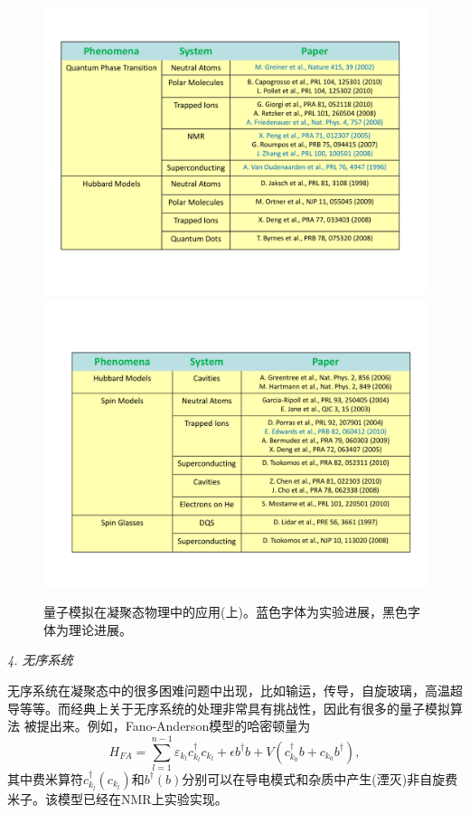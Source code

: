 \begin{figure}[htbp]
            \begin{center}
              \includegraphics[width= 0.8\columnwidth]{figures/simcondense1.pdf}
              \includegraphics[width= 0.8\columnwidth]{figures/simcondense2.pdf}
              \caption{量子模拟在凝聚态物理中的应用(上)。蓝色字体为实验进展，黑色字体为理论进展。
              }
              \label{supersim}
            \end{center}
\end{figure}


\emph{4. 无序系统}

无序系统在凝聚态中的很多困难问题中出现，比如输运，传导，自旋玻璃，高温超导等等。而经典上关于无序系统的处理非常具有挑战性，因此有很多的量子模拟算法
被提出来。例如，Fano-Anderson模型的哈密顿量为
 \begin{equation}\label{supersim}
 H_{FA} = \sum_{l=1}^{n-1}\varepsilon_{k_l} c^{\dagger}_{k_l} c_{k_l}+\epsilon b^{\dagger}b+V(c^{\dagger}_{k_0}b+c_{k_0}b^{\dagger}),
\end{equation}
其中费米算符$c^{\dagger}_{k_l}(c_{k_l})$和$b^{\dagger}(b)$分别可以在导电模式和杂质中产生(湮灭)非自旋费米子。该模型已经在NMR上实验实现\cite{nmrsim4}。

